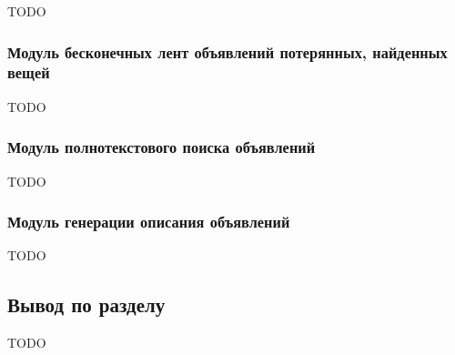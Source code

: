 TODO

\subsubsection{Модуль бесконечных лент объявлений потерянных, найденных вещей}

TODO

\subsubsection{Модуль полнотекстового поиска объявлений}

TODO

\subsubsection{Модуль генерации описания объявлений}

TODO

\subsection*{Вывод по разделу}

TODO